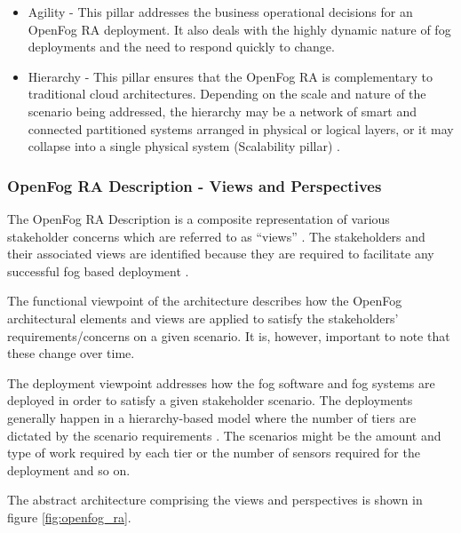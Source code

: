 \documentclass{article}
\begin{document}
\begin{itemize}
\item Agility - This pillar addresses the business operational decisions for an OpenFog RA deployment. It also deals with the highly dynamic nature of fog deployments and the need to respond quickly to change\cite{openfogconsortium2017}.

\item Hierarchy - This pillar ensures that the OpenFog RA is complementary to traditional cloud architectures. Depending on the scale and nature of the scenario being addressed, the hierarchy may be a network of smart and connected partitioned systems arranged in physical or logical layers, or it may collapse into a single physical system (Scalability pillar) \cite{openfogconsortium2017}.
\end{itemize}  

\subsubsection{OpenFog RA Description - Views and Perspectives}

The OpenFog RA Description is a composite representation of various stakeholder concerns which are referred to as ``views'' \cite{openfogconsortium2017}. The stakeholders and their associated views are identified because they are required to facilitate any successful fog based deployment \cite{openfogconsortium2017}. 

The functional viewpoint of the architecture describes how the OpenFog architectural elements and views are applied to satisfy the stakeholders' requirements/concerns on a given scenario. It is, however, important to note that these change over time. 

The deployment viewpoint addresses how the fog software and fog systems are deployed in order to satisfy a given stakeholder scenario. The deployments generally happen in a hierarchy-based model where the number of tiers are dictated by the scenario requirements \cite{openfogconsortium2017}. The scenarios might be the amount and type of work required by each tier or the number of sensors required for the deployment and so on.

The abstract architecture comprising the views and perspectives is shown in figure \ref{fig:openfog_ra}.
\end{document}
